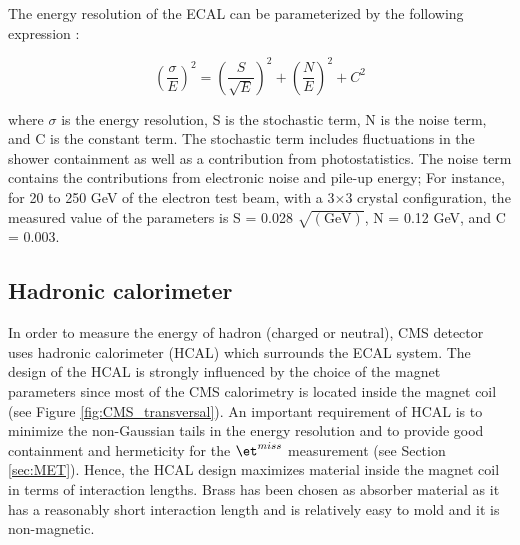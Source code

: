 The energy resolution of the ECAL can be parameterized by the following expression \cite{ECAL_TDR}:

\begin{equation}
(\frac{\sigma}{E})^{2}=(\frac{S}{\sqrt{E}})^{2}+(\frac{N}{E})^{2}+C^{2}
\label{eq:ECAL_resolution}
\end{equation}

where $\sigma$ is the energy resolution, S is the stochastic term, N is the noise term, and C is the constant term. The stochastic term includes fluctuations in the shower containment as well as a contribution from photostatistics. The noise term contains the contributions from electronic noise and pile-up energy;
For instance, for 20 to 250 GeV of the electron test beam, with a 3$\times$3 crystal configuration, the measured value of the parameters is S = 0.028 $\sqrt{\mathrm{(GeV)}}$, N = 0.12 GeV, and C = 0.003.



\subsection{Hadronic calorimeter}\label{subsec:CMS_HCAL}
In order to measure the energy of hadron (charged or neutral), CMS detector uses hadronic calorimeter (HCAL) which surrounds the ECAL system. The design of the HCAL is strongly influenced by the choice of the magnet parameters since most of the CMS calorimetry is located inside the magnet coil (see Figure \ref{fig:CMS_transversal}). An important requirement of HCAL is to minimize the non-Gaussian tails in the energy resolution and to provide good containment and hermeticity for the $\et^{miss}$ measurement (see Section \ref{sec:MET}). Hence, the HCAL design maximizes material inside the magnet coil in terms of interaction lengths. Brass has been chosen as absorber material as it has a reasonably short interaction length and is relatively easy to mold and it is non-magnetic.

